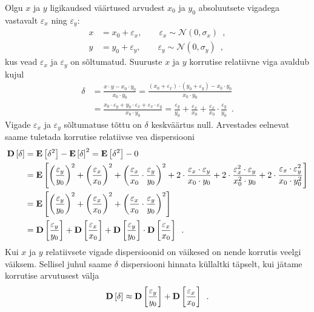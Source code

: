 Olgu $x$ ja $y$ ligikaudsed väärtused arvudest $x_0$ ja $y_0$ absoluutsete vigadega vastavalt $\varepsilon_x$ ning $\varepsilon_y$:
\begin{align*}
    x &= x_0 + \varepsilon_x ,\qquad \varepsilon_x \sim \mathcal{N}(0, \sigma_x) \enspace,\\
    y &= y_0 + \varepsilon_y ,\qquad \varepsilon_y \sim \mathcal{N}(0, \sigma_y) \enspace,
\end{align*}
kus vead $\varepsilon_x$ ja $\varepsilon_y$ on sõltumatud. Suuruste $x$ ja $y$ korrutise relatiivne viga avaldub kujul
\begin{align*}
    \delta &= \frac{x \cdot y - x_0 \cdot y_0}{x_0 \cdot y_0} = \frac{(x_0 + \varepsilon_x) \cdot (y_0 + \varepsilon_y) - x_0 \cdot y_0}{x_0 \cdot y_0} \\
    &= \frac{x_0 \cdot \varepsilon_y + y_0 \cdot \varepsilon_x + \varepsilon_x \cdot \varepsilon_y}{x_0 \cdot y_0} = \frac{\varepsilon_y}{y_0} + \frac{\varepsilon_x}{x_0} + \frac{\varepsilon_x}{x_0} \cdot \frac{\varepsilon_y}{y_0} \enspace.
\end{align*}
Vigade $\varepsilon_x$ ja $\varepsilon_y$ sõltumatuse tõttu on $\delta$ keskväärtus null. Arvestades eelnevat saame tuletada korrutise relatiivse vea dispersiooni
\begin{align*}
    \operatorname*{\mathbf{D}}\left[\delta\right] &= \operatorname*{\mathbf{E}}\left[\delta^2\right] - \operatorname*{\mathbf{E}}\left[\delta\right]^2 = \operatorname*{\mathbf{E}}\left[\delta^2\right] - 0 \\
    &= \operatorname*{\mathbf{E}}\left[\left( \frac{\varepsilon_y}{y_0} \right)^2 + \left( \frac{\varepsilon_x}{x_0} \right)^2 + \left( \frac{\varepsilon_x}{x_0} \cdot \frac{\varepsilon_y}{y_0} \right)^2 + 2\cdot \frac{\varepsilon_x \cdot \varepsilon_y}{x_0 \cdot y_0} + 2\cdot \frac{\varepsilon_x^2 \cdot \varepsilon_y}{x_0^2 \cdot y_0} + 2\cdot \frac{\varepsilon_x \cdot \varepsilon_y^2}{x_0 \cdot y_0^2}\right] \\
    &= \operatorname*{\mathbf{E}}\left[\left( \frac{\varepsilon_y}{y_0} \right)^2 + \left( \frac{\varepsilon_x}{x_0} \right)^2 + \left( \frac{\varepsilon_x}{x_0} \cdot \frac{\varepsilon_y}{y_0} \right)^2\right] \\
    &= \operatorname*{\mathbf{D}}\left[\frac{\varepsilon_y}{y_0}\right] + \operatorname*{\mathbf{D}}\left[\frac{\varepsilon_x}{x_0}\right] + \operatorname*{\mathbf{D}}\left[\frac{\varepsilon_y}{y_0}\right] \cdot \operatorname*{\mathbf{D}}\left[\frac{\varepsilon_x}{x_0}\right] \enspace.
\end{align*}
Kui $x$ ja $y$ relatiivsete vigade dispersioonid on väikesed on nende korrutis veelgi väiksem. Sellisel juhul saame $\delta$ dispersiooni hinnata küllaltki täpselt, kui jätame korrutise arvutusest välja
\begin{equation}
    \label{eq:korrutise relatiivne viga dispersioon ligikaudne}
    \operatorname*{\mathbf{D}}\left[\delta\right] \approx \operatorname*{\mathbf{D}}\left[\frac{\varepsilon_y}{y_0}\right] + \operatorname*{\mathbf{D}}\left[\frac{\varepsilon_x}{x_0}\right] \enspace.
\end{equation}

